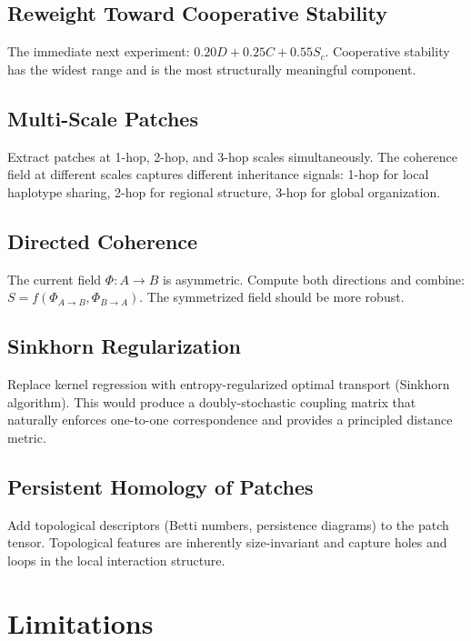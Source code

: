 \documentclass{../yalumba}
\begin{document}
\subsection{Reweight Toward Cooperative Stability}

The immediate next experiment: $0.20D + 0.25C + 0.55S_c$.  Cooperative
stability has the widest range and is the most structurally meaningful
component.

\subsection{Multi-Scale Patches}

Extract patches at 1-hop, 2-hop, and 3-hop scales simultaneously.
The coherence field at different scales captures different inheritance
signals: 1-hop for local haplotype sharing, 2-hop for regional structure,
3-hop for global organization.

\subsection{Directed Coherence}

The current field $\Phi: A \to B$ is asymmetric.  Compute both directions
and combine: $S = f(\Phi_{A \to B}, \Phi_{B \to A})$.  The symmetrized
field should be more robust.

\subsection{Sinkhorn Regularization}

Replace kernel regression with entropy-regularized optimal transport
(Sinkhorn algorithm).  This would produce a doubly-stochastic coupling
matrix that naturally enforces one-to-one correspondence and provides
a principled distance metric.

\subsection{Persistent Homology of Patches}

Add topological descriptors (Betti numbers, persistence diagrams) to the
patch tensor.  Topological features are inherently size-invariant and capture
holes and loops in the local interaction structure.


\section{Limitations}
\label{sec:limitations}
\end{document}
